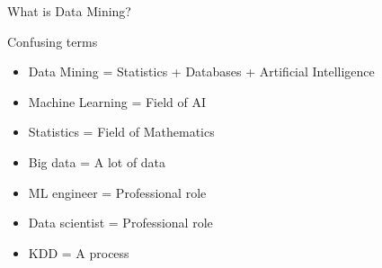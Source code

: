 \documentclass{beamer}
\begin{document}
\begin{frame}{What is Data Mining?}

% 

\begin{center}
 \end{center}

\end{frame}

\begin{frame}{Confusing terms}

\begin{itemize}
    \item \alert{Data Mining} = Statistics + Databases + Artificial Intelligence
    \item \alert{Machine Learning} = Field of AI
    \item \alert{Statistics} = Field of Mathematics
    \item \alert{Big data} = A lot of data
    \item \alert{ML engineer} = Professional role
    \item \alert{Data scientist} = Professional role
    \item \alert{KDD} = A process
\end{itemize}

\end{frame}
\end{document}
